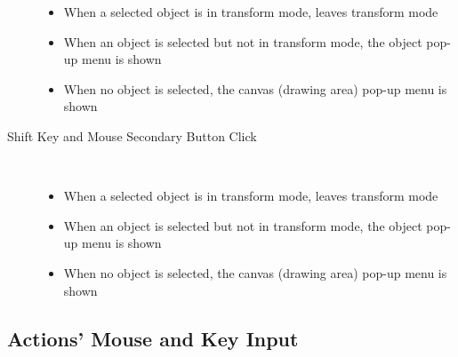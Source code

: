 \begin{description}
\begin{itemize}
		      \item When a selected object is in transform mode,
		        leaves transform mode
		      \item When an object is selected but not in
		        transform mode, the object pop-up menu is shown
		      \item When no object is selected,
		        the canvas (drawing area) pop-up menu is shown
		    \end{itemize}
		  \item[Shift Key and Mouse Secondary Button Click] \hfill \\
		    \begin{itemize}
		      \item When a selected object is in transform mode,
		        leaves transform mode
		      \item When an object is selected but not in
		        transform mode, the object pop-up menu is shown
		      \item When no object is selected,
		        the canvas (drawing area) pop-up menu is shown
		    \end{itemize}
		\end{description}

		\subsection{Actions' Mouse and Key Input}%
		\label{ssec:action_to_input}
















